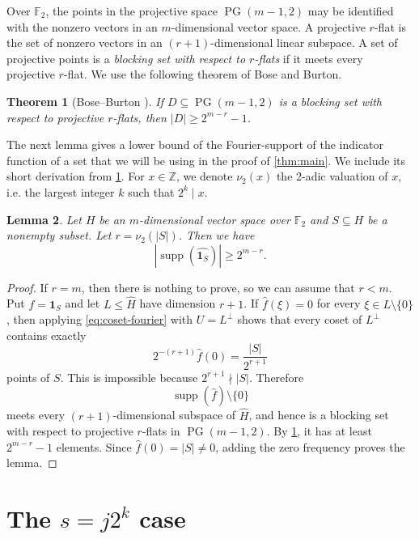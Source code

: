 \documentclass[10pt,a4paper]{amsart}
\newtheorem{theorem}{Theorem}[section]
\newtheorem{lemma}[theorem]{Lemma}
\newcommand{\F}{\mathbb F}
\newcommand{\one}{\mathbf 1}
\DeclareMathOperator{\supp}{supp}
\begin{document}
Over $\F_2$, the points in the projective space $\operatorname{PG}(m-1,2)$
may be identified with the nonzero vectors in an $m$-dimensional vector
space.  A projective $r$-flat is the set of nonzero vectors in an
$(r+1)$-dimensional linear subspace.  A set of projective points is a
\emph{blocking set with respect to $r$-flats} if it meets every
projective $r$-flat.  We use the following theorem of Bose and Burton.

\begin{theorem}[Bose--Burton \cite{BoseBurton1966}]\label{thm:bose-burton}
If $D\subseteq\operatorname{PG}(m-1,2)$ is a blocking set with respect
to projective $r$-flats, then $|D|\ge2^{m-r}-1$.
\end{theorem}

The next lemma gives a lower bound of the Fourier-support of the indicator function of a set that we will be using in the proof of \cref{thm:main}.  We include its short derivation from \cref{thm:bose-burton}. For $x \in \mathbb Z$, we denote $\nu_2(x)$ the 2-adic valuation of $x$, i.e. the largest integer $k$ such that $2^k\mid x$.

\begin{lemma}\label{lem:2adic-support}
Let $H$ be an $m$-dimensional vector space over $\F_2$ and $S\subseteq H$ be a nonempty subset. Let $r=\nu_2(|S|)$.  Then we have
\[
  |\supp(\widehat{\one_S})|\ge2^{m-r}.
\]
\end{lemma}

\begin{proof}
If $r=m$, then there is nothing to prove, so we can assume that $r < m$. 
Put $f=\one_S$ and let $L\le\widehat H$
have dimension $r+1$.  If
$\widehat f(\xi)=0$ for every $\xi\in L\setminus\{0\}$, then applying
\eqref{eq:coset-fourier} with $U=L^\perp$ shows that every coset of
$L^\perp$ contains exactly
\[
  2^{-(r+1)}\widehat f(0)=\frac{|S|}{2^{r+1}}
\]
points of $S$.  This is impossible because $2^{r+1}\nmid |S|$.
Therefore
\[
  \supp(\widehat f)\setminus\{0\}
\]
meets every $(r+1)$-dimensional subspace of $\widehat H$, and hence is a
blocking set with respect to projective $r$-flats in
$\operatorname{PG}(m-1,2)$.  By \cref{thm:bose-burton}, it has at least
$2^{m-r}-1$ elements.  Since $\widehat f(0)=|S|\ne0$, adding the zero
frequency proves the lemma.
\end{proof}


\section{The $s=j2^k$ case}\label{sec:main-proof}
\end{document}

